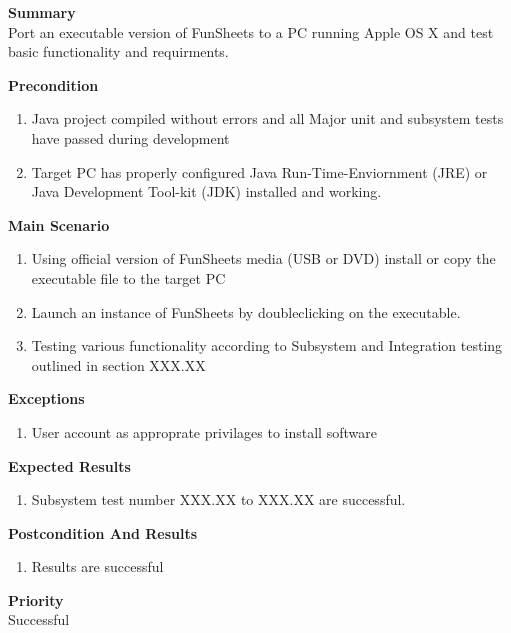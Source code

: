 \documentclass[12pt]{article}
\begin{document}
\noindent
{\bf Summary}\\
Port an executable version of FunSheets to a PC running Apple OS X and test basic functionality and requirments.

\noindent
{\bf Precondition}\\
\begin{enumerate}
\item Java project compiled without errors and all Major unit and subsystem tests have passed during development
\item Target PC has properly configured Java Run-Time-Enviornment (JRE) or Java Development Tool-kit (JDK) installed and working.
\end{enumerate}

\noindent
{\bf Main Scenario}\
\vspace*{-0.2in}
\begin{enumerate}
\item Using official version of FunSheets media (USB or DVD) install or copy the executable file to the target PC
\item Launch an instance of FunSheets by doubleclicking on the executable.
\item Testing various functionality according to Subsystem and Integration testing outlined in section XXX.XX
\end{enumerate}

{\bf Exceptions}\
\begin{enumerate}
\item User account as approprate privilages to install software
\end{enumerate}

{\bf Expected Results}\
\begin{enumerate}
\item Subsystem test number XXX.XX to XXX.XX are successful.
\end{enumerate}

{\bf Postcondition And Results}\
\begin{enumerate}
\item Results are successful
\end{enumerate}

\noindent
{\bf Priority}\\
Successful
\noindent
\end{document}
